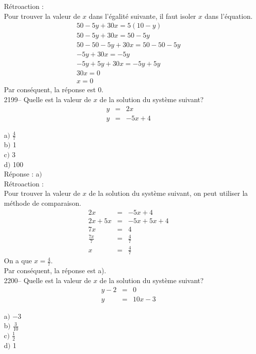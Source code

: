 \documentclass[letterpaper, 12pt]{article}
\begin{document}
R\'etroaction :\\
Pour trouver la valeur de $x$ dans l'\'egalit\'e suivante, il faut isoler $x$ dans l'\'equation.
\begin{eqnarray*}
 50-5y+30x=5(10-y)\\
 50-5y+30x=50-5y\\
 50-50-5y+30x=50-50-5y\\
-5y+30x=-5y\\
-5y+5y+30x=-5y+5y\\
30x=0\\
x=0
\end{eqnarray*}
Par cons\'equent, la r\'eponse est 0. \\

2199-- Quelle est la valeur de $x$ de la solution du syst\`eme suivant?
\begin{eqnarray*}
 y&=&2x\\
y&=&-5x+4
\end{eqnarray*}

a$)$ $\frac{4}{7}$\\[2mm]
b$)$ 1\\
c$)$ 3\\
d$)$ 100\\

R\'eponse : a$)$\\

R\'etroaction :\\
Pour trouver la valeur de $x$ de la solution du syst\`eme suivant, on peut utiliser la m\'ethode de comparaison.
\begin{eqnarray*}
 2x&=&-5x+4\\
 2x+5x&=&-5x+5x+4\\
 7x&=&4\\[2mm]
 \frac{7x}{7}&=&\frac{4}{7}\\[2mm]
x&=&\frac{4}{7}
\end{eqnarray*}
On a que $x=\frac{4}{7}$.\\
Par cons\'equent, la r\'eponse est a).\\


2200-- Quelle est la valeur de $x$ de la solution du syst\`eme suivant?
\begin{eqnarray*}
 y-2&=&0\\
y&=&10x-3
\end{eqnarray*}

a$)$ $-3$\\[2mm]
b$)$ $\frac{3}{10}$\\[2mm]
c$)$ $\frac{1}{2}$\\[2mm]
d$)$ 1\\
\end{document}
